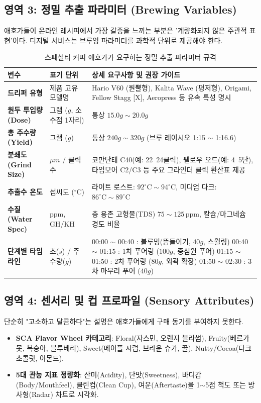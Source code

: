 \documentclass[10pt,a4paper]{article}
\begin{document}
\subsection{영역 3: 정밀 추출 파라미터 (Brewing Variables)}
애호가들이 온라인 레시피에서 가장 갈증을 느끼는 부분은 '계량화되지 않은 주관적 표현'이다. 디지털 서비스는 브루잉 파라미터를 과학적 단위로 제공해야 한다.

\begin{table}[h!]
\centering
\small
\caption{스페셜티 커피 애호가가 요구하는 정밀 추출 파라미터 규격}
\vspace{4pt}
\begin{tabularx}{\textwidth}{llp{7.5cm}}
\toprule
\textbf{변수} & \textbf{표기 단위} & \textbf{상세 요구사항 및 권장 가이드} \\
\midrule
\textbf{드리퍼 유형} & 제품 고유 모델명 & Hario V60 (원뿔형), Kalita Wave (평저형), Origami, Fellow Stagg [X], Aeropress 등 유속 특성 명시 \\
\textbf{원두 투입량 (Dose)} & 그램 ($g$, 소수점 1자리) & 통상 $15.0g \sim 20.0g$ \\
\textbf{총 주수량 (Yield)} & 그램 ($g$) & 통상 $240g \sim 320g$ (브루 레이시오 1:15 $\sim$ 1:16.6) \\
\textbf{분쇄도 (Grind Size)} & $\mu m$ / 클릭수 & 코만단테 C40(예: 22~24클릭), 펠로우 오드(예: 4~5단), 타임모어 C2/C3 등 주요 그라인더 클릭 환산표 제공 \\
\textbf{추출수 온도} & 섭씨도 ($^\circ\text{C}$) & 라이트 로스트: $92^\circ\text{C} \sim 94^\circ\text{C}$, 미디엄 다크: $86^\circ\text{C} \sim 89^\circ\text{C}$ \\
\textbf{수질 (Water Spec)} & ppm, GH/KH & 총 용존 고형물(TDS) $75\sim 125\,\text{ppm}$, 칼슘/마그네슘 경도 비율 \\
\textbf{단계별 타임라인} & 초($s$) / 주수량($g$) & \makecell[l]{00:00 $\sim$ 00:40 : 블루밍(뜸들이기, $40g$, 스월링)\\ 00:40 $\sim$ 01:15 : 1차 푸어링 ($100g$, 중심원 푸어)\\ 01:15 $\sim$ 01:50 : 2차 푸어링 ($80g$, 외곽 확장)\\ 01:50 $\sim$ 02:30 : 3차 마무리 푸어 ($40g$)} \\
\bottomrule
\end{tabularx}
\end{table}

\subsection{영역 4: 센서리 및 컵 프로파일 (Sensory Attributes)}
단순히 "고소하고 달콤하다"는 설명은 애호가들에게 구매 동기를 부여하지 못한다.
\begin{itemize}[itemsep=2pt]
    \item \textbf{SCA Flavor Wheel 카테고리}: Floral(자스민, 오렌지 블라썸), Fruity(베르가못, 복숭아, 블루베리), Sweet(메이플 시럽, 브라운 슈가, 꿀), Nutty/Cocoa(다크 초콜릿, 아몬드).
    \item \textbf{5대 관능 지표 정량화}: 산미(Acidity), 단맛(Sweetness), 바디감(Body/Mouthfeel), 클린컵(Clean Cup), 여운(Aftertaste)을 1$\sim$5점 척도 또는 방사형(Radar) 차트로 시각화.
\end{itemize}
\end{document}
